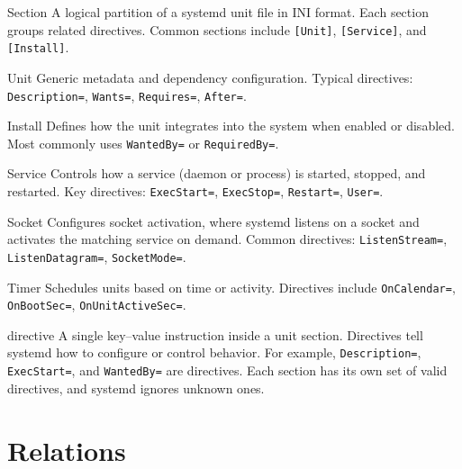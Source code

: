 \documentclass[openany, 12pt]{book}
\begin{document}
\begin{definition}{Section}{}
  A logical partition of a systemd unit file in INI format. Each section
  groups related directives. Common sections include \texttt{[Unit]},
  \texttt{[Service]}, and \texttt{[Install]}.
\end{definition}

\begin{definition}{Unit}{}
  Generic metadata and dependency configuration. Typical directives:
  \texttt{Description=}, \texttt{Wants=}, \texttt{Requires=}, \texttt{After=}.
\end{definition}

\begin{definition}{Install}{}
  Defines how the unit integrates into the system when enabled or disabled.
  Most commonly uses \texttt{WantedBy=} or \texttt{RequiredBy=}.
\end{definition}

\begin{definition}{Service}{}
  Controls how a service (daemon or process) is started, stopped, and
  restarted. Key directives: \texttt{ExecStart=}, \texttt{ExecStop=},
  \texttt{Restart=}, \texttt{User=}.
\end{definition}

\begin{definition}{Socket}{}
  Configures socket activation, where systemd listens on a socket and
  activates the matching service on demand. Common directives:
  \texttt{ListenStream=}, \texttt{ListenDatagram=}, \texttt{SocketMode=}.
\end{definition}

\begin{definition}{Timer}{}
  Schedules units based on time or activity. Directives include
  \texttt{OnCalendar=}, \texttt{OnBootSec=}, \texttt{OnUnitActiveSec=}.
\end{definition}

\begin{definition}{directive}{}
  A single key--value instruction inside a unit section. Directives tell
  systemd how to configure or control behavior. For example,
  \texttt{Description=}, \texttt{ExecStart=}, and \texttt{WantedBy=} are
  directives. Each section has its own set of valid directives, and
  systemd ignores unknown ones.
\end{definition}


\chapter{Relations}
\end{document}
